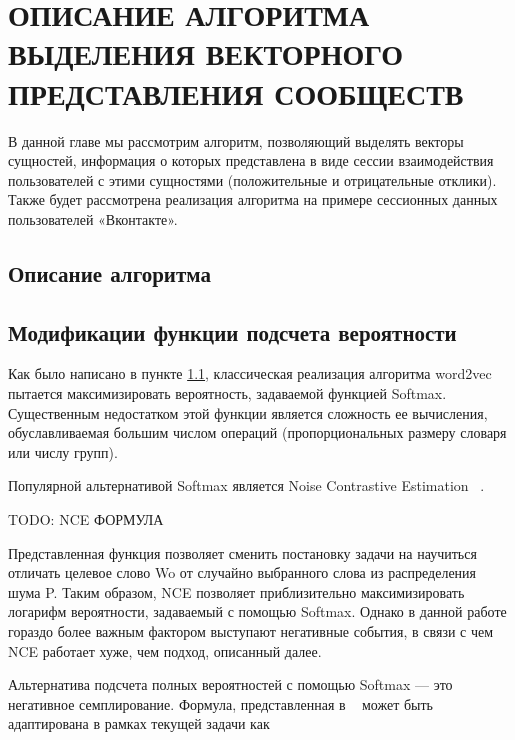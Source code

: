 \documentclass[times,specification,annotation]{itmo-student-thesis}
\begin{document}
\finishrelatedwork

\chapter{ОПИСАНИЕ АЛГОРИТМА ВЫДЕЛЕНИЯ ВЕКТОРНОГО ПРЕДСТАВЛЕНИЯ СООБЩЕСТВ}

В данной главе мы рассмотрим алгоритм, позволяющий выделять векторы
сущностей, информация о которых представлена в виде сессии взаимодействия
пользователей с этими сущностями (положительные и отрицательные отклики).
Также будет рассмотрена реализация алгоритма на примере сессионных данных
пользователей «Вконтакте».


\section{Описание алгоритма}\label{sec:algo}

\section{Модификации функции подсчета вероятности }
Как было написано в пункте \ref{sec:algo}, классическая реализация
алгоритма word2vec пытается максимизировать вероятность, задаваемой функцией
Softmax. Существенным недостатком этой функции является сложность ее
вычисления, обуславливаемая большим числом операций (пропорциональных
размеру словаря или числу групп).



Популярной альтернативой Softmax является Noise Contrastive Estimation ~\cite{mikolov2013distributed}.

TODO: NCE ФОРМУЛА

Представленная функция позволяет сменить постановку задачи на научиться
отличать целевое слово Wo от случайно выбранного слова из распределения шума
P. Таким образом, NCE позволяет приблизительно максимизировать логарифм
вероятности, задаваемый с помощью Softmax. Однако в данной работе гораздо
более важным фактором выступают негативные события, в связи с чем NCE
работает хуже, чем подход, описанный далее.

Альтернатива подсчета полных вероятностей с помощью Softmax --- это
негативное семплирование. Формула, представленная в ~\cite{airbnb} может быть
адаптирована в рамках текущей задачи как
\end{document}
